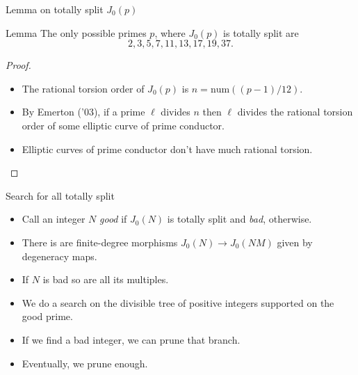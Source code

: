 \documentclass{beamer}
\newcommand{\num}{\mathrm{num}}
\begin{document}
\begin{frame}{Lemma on totally split $J_0(p)$}
    \begin{block}{Lemma}
    The only possible primes $p$, where $J_0(p)$ is totally split are
    \[
        2, 3, 5, 7, 11, 13, 17, 19, 37.
    \]
    \end{block}
    \begin{proof}
        \begin{itemize}
            \item
                The rational torsion order of $J_0(p)$ is $n=\num((p-1)/12)$.
            \item
                By Emerton ('03), if a prime $\ell$ divides $n$ then $\ell$ divides the rational
                torsion order of some elliptic curve of prime conductor.
            \item
                Elliptic curves of prime conductor don't have much rational
                torsion.
        \end{itemize}
   \end{proof}
\end{frame}

\begin{frame}{Search for all totally split}
    \begin{itemize}
        \item
            Call an integer $N$ \emph{good} if $J_0(N)$ is totally split and
            \emph{bad}, otherwise.
        \item
            There is are finite-degree morphisms $J_0(N)\to J_0(NM)$ given by
            degeneracy maps.
        \item
            If $N$ is bad so are all its multiples.
        \item
            We do a search on the divisible tree of positive integers
            supported on the good prime.
        \item
            If we find a bad integer, we can prune that branch.
        \item
            Eventually, we prune enough.
    \end{itemize}
\end{frame}
\end{document}
